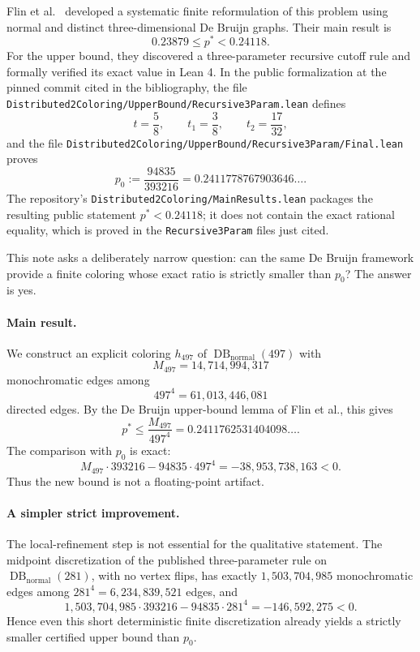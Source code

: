 \documentclass[11pt]{article}
\newcommand{\DB}{\operatorname{DB}}
\newcommand{\normal}{\mathrm{normal}}
\newcommand{\1}{\mathbf{1}}
\begin{document}
Flin et al.~\cite{flin2026arxiv,flin2026podc} developed a systematic finite
reformulation of this problem using normal and distinct three-dimensional De
Bruijn graphs.  Their main result is
\[
  0.23879\le p^*<0.24118.
\]
For the upper bound, they discovered a three-parameter recursive cutoff rule
and formally verified its exact value in Lean 4.  In the public formalization
at the pinned commit cited in the bibliography, the file
\texttt{Distributed2Coloring/UpperBound/Recursive3Param.lean} defines
\[
  t = \frac58,
  \qquad
  t_1 = \frac38,
  \qquad
  t_2 = \frac{17}{32},
\]
and the file
\texttt{Distributed2Coloring/UpperBound/Recursive3Param/Final.lean}
proves~\cite{flin2026lean}
\[
  p_0:=\frac{94835}{393216}
  =0.2411778767903646\ldots.
\]
The repository's \texttt{Distributed2Coloring/MainResults.lean} packages
the resulting public statement $p^*<0.24118$; it does not contain the exact
rational equality, which is proved in the \texttt{Recursive3Param} files
just cited.

This note asks a deliberately narrow question: can the same De Bruijn
framework provide a finite coloring whose exact ratio is strictly smaller
than $p_0$?  The answer is yes.

\paragraph{Main result.}
We construct an explicit coloring $h_{497}$ of $\DB_{\normal}(497)$ with
\[
  M_{497}=14{,}714{,}994{,}317
\]
monochromatic edges among
\[
  497^4=61{,}013{,}446{,}081
\]
directed edges.  By the De Bruijn upper-bound lemma of Flin et al., this gives
\[
  p^*\le\frac{M_{497}}{497^4}
  =0.2411762531404098\ldots.
\]
The comparison with $p_0$ is exact:
\[
  M_{497}\cdot393216
  -94835\cdot497^4
  =-38{,}953{,}738{,}163<0.
\]
Thus the new bound is not a floating-point artifact.

\paragraph{A simpler strict improvement.}
The local-refinement step is not essential for the qualitative statement.
The midpoint discretization of the published three-parameter rule on
$\DB_{\normal}(281)$, with no vertex flips, has exactly
$1{,}503{,}704{,}985$ monochromatic edges among $281^4=6{,}234{,}839{,}521$
edges, and
\[
  1{,}503{,}704{,}985\cdot393216
  -94835\cdot281^4
  =-146{,}592{,}275<0.
\]
Hence even this short deterministic finite discretization already yields a
strictly smaller certified upper bound than $p_0$.
\end{document}
